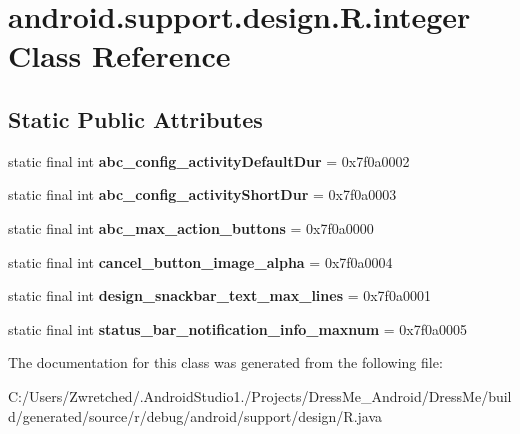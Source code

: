 \hypertarget{classandroid_1_1support_1_1design_1_1_r_1_1integer}{}\section{android.\+support.\+design.\+R.\+integer Class Reference}
\label{classandroid_1_1support_1_1design_1_1_r_1_1integer}
\subsection*{Static Public Attributes}
\begin{DoxyCompactItemize}
\item 
\hypertarget{classandroid_1_1support_1_1design_1_1_r_1_1integer_ab0c8a771ad2ae3aba6dc8d9823755f3e}{}static final int {\bfseries abc\+\_\+config\+\_\+activity\+Default\+Dur} = 0x7f0a0002\label{classandroid_1_1support_1_1design_1_1_r_1_1integer_ab0c8a771ad2ae3aba6dc8d9823755f3e}

\item 
\hypertarget{classandroid_1_1support_1_1design_1_1_r_1_1integer_a5cc6424d72a443bb45486cf8746b7bc1}{}static final int {\bfseries abc\+\_\+config\+\_\+activity\+Short\+Dur} = 0x7f0a0003\label{classandroid_1_1support_1_1design_1_1_r_1_1integer_a5cc6424d72a443bb45486cf8746b7bc1}

\item 
\hypertarget{classandroid_1_1support_1_1design_1_1_r_1_1integer_a776adf341d96f93e5e66016c2a8b8edb}{}static final int {\bfseries abc\+\_\+max\+\_\+action\+\_\+buttons} = 0x7f0a0000\label{classandroid_1_1support_1_1design_1_1_r_1_1integer_a776adf341d96f93e5e66016c2a8b8edb}

\item 
\hypertarget{classandroid_1_1support_1_1design_1_1_r_1_1integer_a3b9b1c57b76ebfa9f445b3f40ee6f2ad}{}static final int {\bfseries cancel\+\_\+button\+\_\+image\+\_\+alpha} = 0x7f0a0004\label{classandroid_1_1support_1_1design_1_1_r_1_1integer_a3b9b1c57b76ebfa9f445b3f40ee6f2ad}

\item 
\hypertarget{classandroid_1_1support_1_1design_1_1_r_1_1integer_a938a7c8efcde243e2e8cf2089e78f7f0}{}static final int {\bfseries design\+\_\+snackbar\+\_\+text\+\_\+max\+\_\+lines} = 0x7f0a0001\label{classandroid_1_1support_1_1design_1_1_r_1_1integer_a938a7c8efcde243e2e8cf2089e78f7f0}

\item 
\hypertarget{classandroid_1_1support_1_1design_1_1_r_1_1integer_a4b128748dfc77dbedbe2c85115af5a64}{}static final int {\bfseries status\+\_\+bar\+\_\+notification\+\_\+info\+\_\+maxnum} = 0x7f0a0005\label{classandroid_1_1support_1_1design_1_1_r_1_1integer_a4b128748dfc77dbedbe2c85115af5a64}

\end{DoxyCompactItemize}


The documentation for this class was generated from the following file\+:\begin{DoxyCompactItemize}
\item 
C\+:/\+Users/\+Zwretched/.\+Android\+Studio1./\+Projects/\+Dress\+Me\+\_\+\+Android/\+Dress\+Me/build/generated/source/r/debug/android/support/design/R.\+java\end{DoxyCompactItemize}
